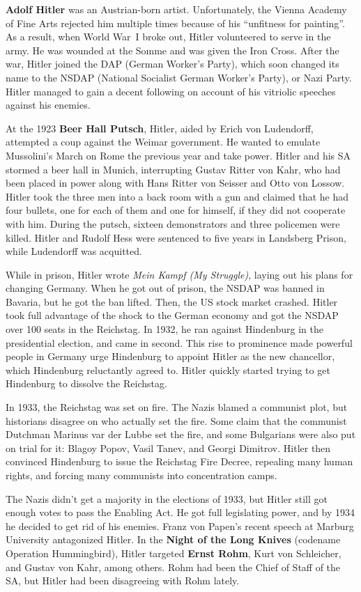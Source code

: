 \textbf{Adolf Hitler} was an Austrian-born artist.
Unfortunately, the Vienna Academy of Fine Arts rejected him multiple times because of his ``unfitness for painting''.
As a result, when World War~I broke out, Hitler volunteered to serve in the army.
He was wounded at the Somme and was given the Iron Cross.
After the war, Hitler joined the DAP (German Worker's Party),
which soon changed its name to the NSDAP (National Socialist German Worker's Party), or Nazi Party.
Hitler managed to gain a decent following on account of his vitriolic speeches against his enemies.

At the 1923 \textbf{Beer Hall Putsch}, Hitler, aided by Erich von Ludendorff,
attempted a coup against the Weimar government.
He wanted to emulate Mussolini's March on Rome the previous year and take power.
Hitler and his SA stormed a beer hall in Munich, interrupting Gustav Ritter von Kahr,
who had been placed in power along with Hans Ritter von Seisser and Otto von Lossow.
Hitler took the three men into a back room with a gun and claimed that he had four bullets,
one for each of them and one for himself, if they did not cooperate with him.
During the putsch, sixteen demonstrators and three policemen were killed.
Hitler and Rudolf Hess were sentenced to five years in Landsberg Prison,
while Ludendorff was acquitted.

While in prison, Hitler wrote \textit{Mein Kampf (My Struggle)}, laying out his plans for changing Germany.
When he got out of prison, the NSDAP was banned in Bavaria, but he got the ban lifted.
Then, the US stock market crashed.
Hitler took full advantage of the shock to the German economy and got the NSDAP over 100 seats in the Reichstag.
In 1932, he ran against Hindenburg in the presidential election, and came in second.
This rise to prominence made powerful people in Germany urge Hindenburg to appoint Hitler as the new chancellor,
which Hindenburg reluctantly agreed to.
Hitler quickly started trying to get Hindenburg to dissolve the Reichstag.

In 1933, the Reichstag was set on fire.
The Nazis blamed a communist plot, but historians disagree on who actually set the fire.
Some claim that the communist Dutchman Marinus var der Lubbe set the fire,
and some Bulgarians were also put on trial for it: Blagoy Popov, Vasil Tanev, and Georgi Dimitrov.
Hitler then convinced Hindenburg to issue the Reichstag Fire Decree,
repealing many human rights, and forcing many communists into concentration camps.

The Nazis didn't get a majority in the elections of 1933, but Hitler still got enough votes to pass the Enabling Act.
He got full legislating power, and by 1934 he decided to get rid of his enemies.
Franz von Papen's recent speech at Marburg University antagonized Hitler.
In the \textbf{Night of the Long Knives} (codename Operation Hummingbird),
Hitler targeted \textbf{Ernst Rohm}, Kurt von Schleicher, and Gustav von Kahr, among others.
Rohm had been the Chief of Staff of the SA, but Hitler had been disagreeing with Rohm lately.

